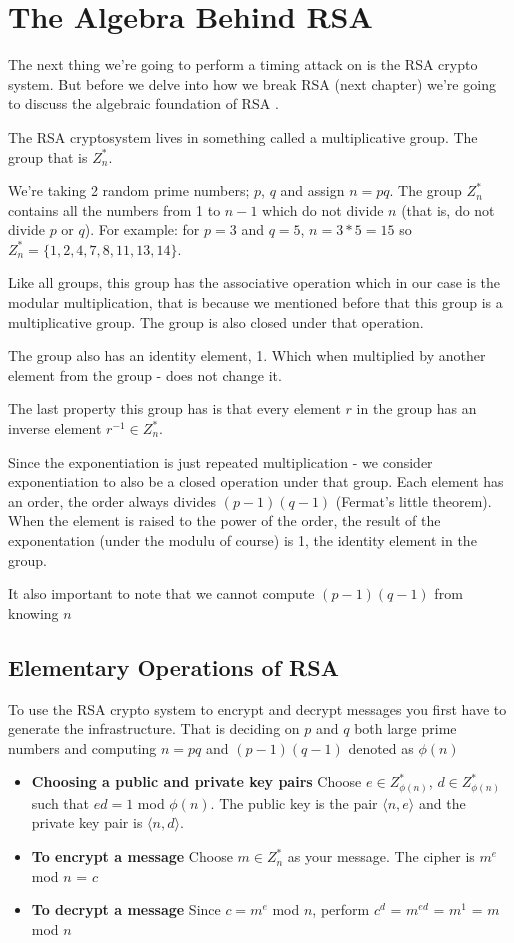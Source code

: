 \section{The Algebra Behind RSA}
The next thing we're going to perform a timing attack on is the RSA crypto system.
But before we delve into how we break RSA (next chapter) we're going to discuss the
algebraic foundation of RSA \cite{kaliski2006mathematics}.

The RSA cryptosystem lives in something called a multiplicative group.
The group that is $Z^{*}_n$.

We're taking 2 random prime numbers; $p$, $q$ and assign $n=pq$. The group $Z^{*}_n$ 
contains all the numbers from 1 to $n-1$ which do not divide $n$ (that is, do not divide $p$ or $q$).
For example: for $p=3$ and $q=5$, $n= 3*5 = 15$ so $Z^{*}_n = {\{1,2,4,7,8,11,13,14\}}$.

Like all groups, this group has the associative operation which in our case is the modular multiplication,
that is because we mentioned before that this group is a multiplicative group.
The group is also closed under that operation.

The group also has an identity element, 1. Which when multiplied by another element from the group - does not change it.

The last property this group has is that every element $r$ in the group
has an inverse element $r^{-1} \in Z^{*}_n$.

Since the exponentiation is just repeated multiplication - we consider exponentiation 
to also be a closed operation under that group. Each element has an order, the order always divides $(p-1)(q-1)$ (Fermat's little theorem).
When the element is raised to the power of the order, the result of the exponentation (under the modulu of course) is 1, the identity element in the group.

It also important to note that we cannot compute $(p-1)(q-1)$ from knowing $n$

\subsection{Elementary Operations of RSA}
To use the RSA crypto system to encrypt and decrypt messages you first have to generate the infrastructure.
That is deciding on $p$ and $q$ both large prime numbers and computing $n = pq$ and $(p-1)(q-1)$ denoted as $\phi(n)$

\begin{itemize}
    \item \textbf{Choosing a public and private key pairs}
    Choose $e \in Z^{*}_{\phi(n)}$, $d \in Z^{*}_{\phi(n)}$ such that $ed = 1$ mod $\phi(n)$.
    The public key is the pair $\langle{n,e}\rangle$  and the private key pair is  $\langle{n,d}\rangle$.
    \item \textbf{To encrypt a message}
    Choose $m \in Z^{*}_n$ as your message.
    The cipher is $m^{e}$ mod $n$ = $c$
    \item \textbf{To decrypt a message}
    Since $c = m^{e}$ mod $n$, perform $c^{d}$ = $m^{ed}$ = $m^{1}$ = $m$ mod $n$
\end{itemize}

